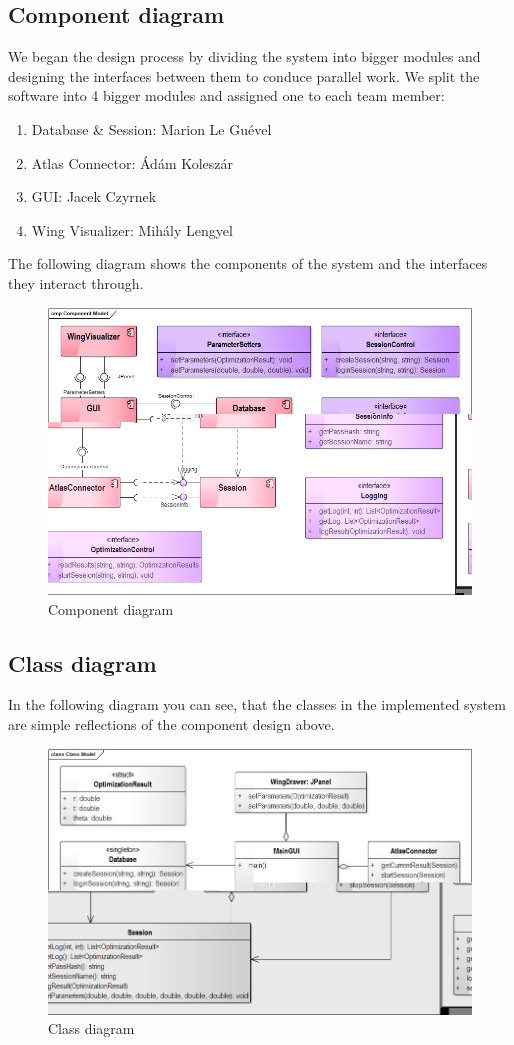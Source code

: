 \documentclass[10pt,a4paper]{report}
\begin{document}
\subsection{Component diagram}
We began the design process by dividing the system into bigger modules and designing the interfaces between them to conduce parallel work. We split the software into 4 bigger modules and assigned one to each team member:\\
\begin{enumerate}
\item Database \& Session: Marion Le Guével
\item Atlas Connector: Ádám Koleszár
\item GUI: Jacek Czyrnek
\item Wing Visualizer: Mihály Lengyel
\end{enumerate}
The following diagram shows the components of the system and the interfaces they interact through.
\begin{figure}[h!]
\includegraphics[width=\textwidth]{CompModel.jpg}
\caption{Component diagram}
\end{figure}
\pagebreak

\subsection{Class diagram}
In the following diagram you can see, that the classes in the implemented system are simple reflections of the component design above.
\begin{figure}[h!]
\includegraphics[width=\textwidth]{ClassModel.jpg}
\caption{Class diagram}
\end{figure}
\pagebreak
\end{document}
